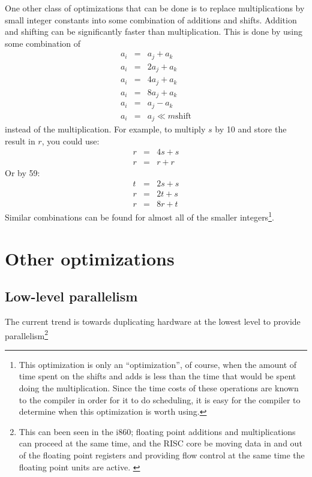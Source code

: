 One other class of optimizations that can be done is to replace multiplications
by small integer constants into some combination of additions and shifts.
Addition and shifting can be significantly faster than multiplication.  This is
done by using some combination of \begin{eqnarray*} a_i & = & a_j + a_k \\ a_i &
= & 2a_j + a_k \\ a_i & = & 4a_j + a_k \\ a_i & = & 8a_j + a_k \\ a_i & = & a_j
- a_k \\ a_i & = & a_j \ll m \mbox{shift} \end{eqnarray*} instead of the
multiplication.  For example, to multiply $s$ by 10 and store the result in $r$,
you could use: \begin{eqnarray*} r & = & 4s + s\\ r & = & r + r \end{eqnarray*}
	Or by 59: \begin{eqnarray*} t & = & 2s + s \\ r & = & 2t + s \\ r & = &
	8r + t \end{eqnarray*} Similar combinations can be found for almost all
	of the smaller integers\footnote{This optimization is only an
	``optimization'', of course, when the amount of time spent on the shifts
	and adds is less than the time that would be spent doing the
	multiplication.  Since the time costs of these operations are known to
	the compiler in order for it to do scheduling, it is easy for the
	compiler to determine when this optimization is worth using.}.
	\cite{magenheimer:precision}

\section{Other optimizations}

\subsection{Low-level parallelism}

The current trend is towards duplicating hardware at the lowest level to provide
parallelism\footnote{This can been seen in the i860; floating point additions
and multiplications can proceed at the same time, and the RISC core be moving
data in and out of the floating point registers and providing flow control at
the same time the floating point units are active. \cite{byte:i860}}

